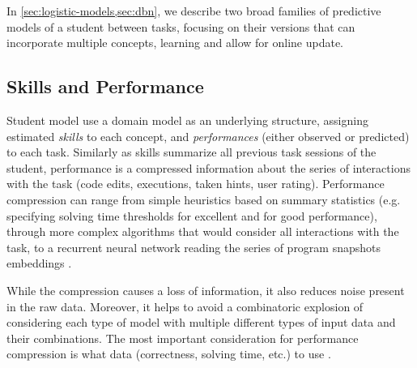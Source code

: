 In \cref{sec:logistic-models,sec:dbn}, we describe two broad
families of predictive models of a student between tasks,
focusing on their versions %
that can incorporate multiple concepts, learning and allow for online update. %

\subsection{Skills and Performance}

Student model use a domain model as an underlying structure,
assigning estimated \emph{skills} to each concept, %
and \emph{performances} (either observed or predicted) to each task.
Similarly as skills summarize all previous task sessions of the student,
performance is a compressed information about the series of
interactions with the task (code edits, executions, taken hints, user rating). %
Performance compression can range from simple heuristics based on summary statistics
(e.g. specifying solving time thresholds for excellent and for good performance),
through more complex algorithms that would consider all interactions with the task,
to a recurrent neural network reading the series
of program snapshots embeddings  %
\cite{student-models-deep-learning}.

While the compression causes a loss of information, it also reduces noise
present in the raw data. Moreover, it helps to avoid a combinatoric
explosion of considering each type of model with multiple different types of
input data and their combinations.
The most important consideration for performance compression is what data
(correctness, solving time, etc.) to use \cite{alg.mastery}.

